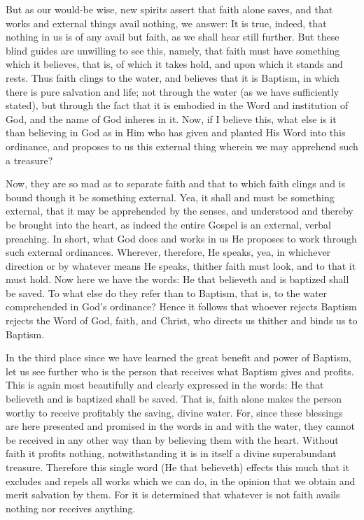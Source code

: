 But as our would-be wise, new spirits assert that faith alone saves,
and that works and external things avail nothing, we answer: It is
true, indeed, that nothing in us is of any avail but faith, as we shall
hear still further. But these blind guides are unwilling to see this,
namely, that faith must have something which it believes, that is, of
which it takes hold, and upon which it stands and rests. Thus faith
clings to the water, and believes that it is Baptism, in which there is
pure salvation and life; not through the water (as we have sufficiently
stated), but through the fact that it is embodied in the Word and
institution of God, and the name of God inheres in it. Now, if I
believe this, what else is it than believing in God as in Him who has
given and planted His Word into this ordinance, and proposes to us this
external thing wherein we may apprehend such a treasure?

Now, they are so mad as to separate faith and that to which faith
clings and is bound though it be something external. Yea, it shall and
must be something external, that it may be apprehended by the senses,
and understood and thereby be brought into the heart, as indeed the
entire Gospel is an external, verbal preaching. In short, what God does
and works in us He proposes to work through such external ordinances.
Wherever, therefore, He speaks, yea, in whichever direction or by
whatever means He speaks, thither faith must look, and to that it must
hold. Now here we have the words: He that believeth and is baptized
shall be saved. To what else do they refer than to Baptism, that is, to
the water comprehended in God's ordinance? Hence it follows that
whoever rejects Baptism rejects the Word of God, faith, and Christ, who
directs us thither and binds us to Baptism.

In the third place since we have learned the great benefit and power of
Baptism, let us see further who is the person that receives what
Baptism gives and profits. This is again most beautifully and clearly
expressed in the words: He that believeth and is baptized shall be
saved. That is, faith alone makes the person worthy to receive
profitably the saving, divine water. For, since these blessings are
here presented and promised in the words in and with the water, they
cannot be received in any other way than by believing them with the
heart. Without faith it profits nothing, notwithstanding it is in
itself a divine superabundant treasure. Therefore this single word (He
that believeth) effects this much that it excludes and repels all
works which we can do, in the opinion that we obtain and merit
salvation by them. For it is determined that whatever is not faith
avails nothing nor receives anything.

